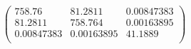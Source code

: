 \documentclass{article}
\begin{document}
\[\left(
\begin{array}{ccc}
 758.76 & 81.2811 & 0.00847383 \\
 81.2811 & 758.764 & 0.00163895 \\
 0.00847383 & 0.00163895 & 41.1889 \\
\end{array}
\right)\]
\end{document}

